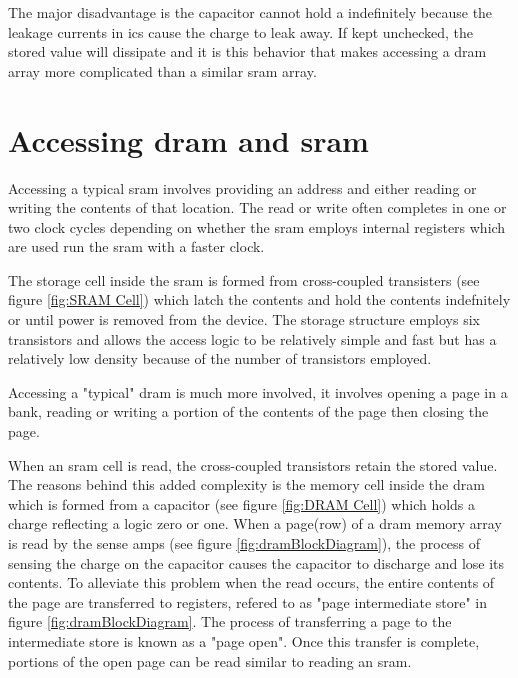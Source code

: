 The major disadvantage is the capacitor cannot hold a indefinitely because the leakage currents in \acp{ic} cause the charge to leak away. 
If kept unchecked, the stored value will dissipate and it is this behavior that makes accessing a \ac{dram} array more complicated than a similar \ac{sram} array.

\section{Accessing \ac{dram} and \ac{sram}}
\label{Accessing DRAM and SRAM}

Accessing a typical \ac{sram} involves providing an address and either reading or writing the contents of that location. 
The read or write often completes in one or two clock cycles depending on whether the \ac{sram} employs internal registers which are used run the \ac{sram} with a faster clock.

The storage cell inside the \ac{sram} is formed from cross-coupled transisters (see figure \ref{fig:SRAM Cell}) which latch the contents and hold the contents indefnitely or until power is removed from the device.
The storage structure employs six transistors and allows the access logic to be relatively simple and fast but has a relatively low density because of the number of transistors employed.

Accessing a "typical" \ac{dram} is much more involved, it involves opening a page in a bank, reading or writing a portion of the contents of the page then closing the page. 

When an \ac{sram} cell is read, the cross-coupled transistors retain the stored value. 
The reasons behind this added complexity is the memory cell inside the \ac{dram} which is formed from a capacitor (see figure \ref{fig:DRAM Cell}) which holds a charge reflecting a logic zero or one. 
When a page(row) of a \ac{dram} memory array is read by the sense amps (see figure \ref{fig:dramBlockDiagram}), the process of sensing the charge on the capacitor causes the capacitor to discharge and lose its contents. 
To alleviate this problem \iffalse \ac{dram} arrays are formed from a column of storage elements known as a page. \fi when the read occurs, the entire contents of the page are transferred to registers, refered to as "page intermediate store" in figure \ref{fig:dramBlockDiagram}. 
The process of transferring a page to the intermediate store is known as a "page open".
Once this transfer is complete, portions of the open page can be read similar to reading an \ac{sram}. 

